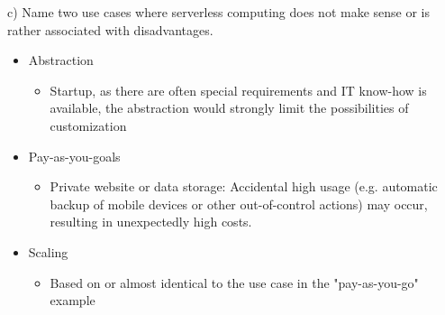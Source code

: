 \documentclass{article}
\begin{document}
c) Name two use cases where serverless computing does not make sense or is rather associated with disadvantages.
\begin{itemize}
    \item Abstraction
          \begin{itemize}
              \item Startup, as there are often special requirements and IT know-how is available, the abstraction would strongly limit the possibilities of customization
          \end{itemize}
    \item Pay-as-you-goals
          \begin{itemize}
              \item Private website or data storage: Accidental high usage (e.g. automatic backup of mobile devices or other out-of-control actions) may occur, resulting in unexpectedly high costs.
          \end{itemize}
    \item Scaling
          \begin{itemize}
              \item Based on or almost identical to the use case in the "pay-as-you-go" example
          \end{itemize}
\end{itemize}
\end{document}
